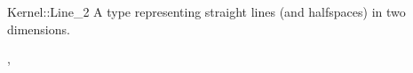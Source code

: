 \begin{ccRefConcept}{Kernel::Line_2}
A type representing straight lines (and halfspaces) in two dimensions.

\ccRefines
{},

\ccSeeAlso
{}

\end{ccRefConcept}
